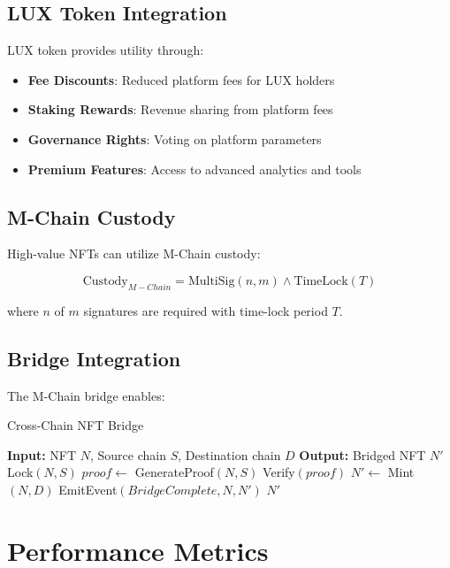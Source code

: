 \documentclass[11pt,a4paper]{article}
\begin{document}
\subsection{LUX Token Integration}

LUX token provides utility through:

\begin{itemize}
\item \textbf{Fee Discounts}: Reduced platform fees for LUX holders
\item \textbf{Staking Rewards}: Revenue sharing from platform fees
\item \textbf{Governance Rights}: Voting on platform parameters
\item \textbf{Premium Features}: Access to advanced analytics and tools
\end{itemize}

\subsection{M-Chain Custody}

High-value NFTs can utilize M-Chain custody:

\begin{equation}
\text{Custody}_{M-Chain} = \text{MultiSig}(n, m) \land \text{TimeLock}(T)
\end{equation}

where $n$ of $m$ signatures are required with time-lock period $T$.

\subsection{Bridge Integration}

The M-Chain bridge enables:

\begin{algorithm}
\caption{Cross-Chain NFT Bridge}
\begin{algorithmic}
\STATE \textbf{Input:} NFT $N$, Source chain $S$, Destination chain $D$
\STATE \textbf{Output:} Bridged NFT $N'$
\STATE
\STATE Lock$(N, S)$ 
\STATE $proof \leftarrow$ GenerateProof$(N, S)$
\STATE Verify$(proof)$ 
\STATE $N' \leftarrow$ Mint$(N, D)$ 
\STATE EmitEvent$(BridgeComplete, N, N')$
\RETURN $N'$
\end{algorithmic}
\end{algorithm}

\section{Performance Metrics}
\end{document}
